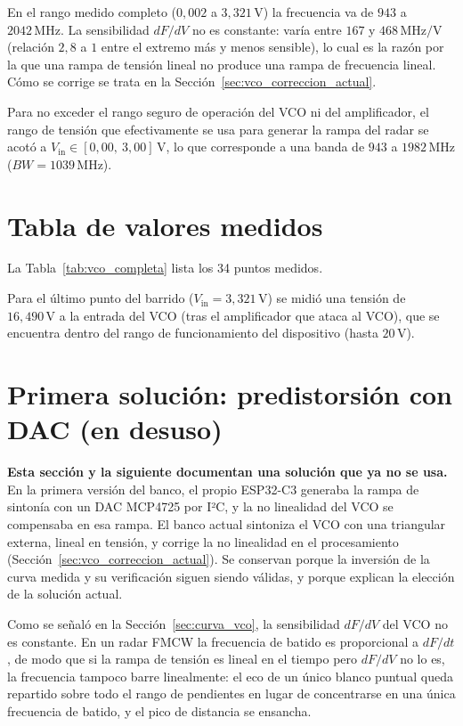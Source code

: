 \documentclass[12pt, a4paper, twoside]{report}
\begin{document}
En el rango medido completo ($0{,}002$ a $3{,}321\,\text{V}$) la
frecuencia va de $943$ a $2042\,\text{MHz}$. La sensibilidad $dF/dV$
no es constante: varía entre $167$ y $468\,\text{MHz/V}$ (relación
$2{,}8$ a $1$ entre el extremo más y menos sensible), lo cual es la
razón por la que una rampa de tensión lineal no produce una rampa de
frecuencia lineal. Cómo se corrige se trata en la
Sección~\ref{sec:vco_correccion_actual}.

Para no exceder el rango seguro de operación del VCO ni del amplificador, el
rango de tensión que efectivamente se usa para generar la rampa del
radar se acotó a $V_\text{in} \in [0{,}00,\ 3{,}00]\,\text{V}$, lo que
corresponde a una banda de $943$ a $1982\,\text{MHz}$
($BW = 1039\,\text{MHz}$).

\section{Tabla de valores medidos}
\label{sec:tabla_vco}

La Tabla~\ref{tab:vco_completa} lista los 34 puntos medidos.



Para el último punto del barrido ($V_\text{in} = 3{,}321\,\text{V}$) se
midió una tensión de $16{,}490\,\text{V}$ a la entrada del VCO (tras el
amplificador que ataca al VCO), que se encuentra dentro del rango
de funcionamiento del dispositivo (hasta $20\,\text{V}$).

\section{Primera solución: predistorsión con DAC (en desuso)}
\label{sec:predistorsion_pchip}

\textbf{Esta sección y la siguiente documentan una solución que ya no se
usa.} En la primera versión del banco, el propio ESP32-C3 generaba la rampa
de sintonía con un DAC MCP4725 por I²C, y la no linealidad del VCO se
compensaba en esa rampa. El banco actual sintoniza el VCO con una triangular
externa, lineal en tensión, y corrige la no linealidad en el procesamiento
(Sección~\ref{sec:vco_correccion_actual}). Se conservan porque la inversión
de la curva medida y su verificación siguen siendo válidas, y porque
explican la elección de la solución actual.

Como se señaló en la Sección~\ref{sec:curva_vco}, la sensibilidad
$dF/dV$ del VCO no es constante. En un radar FMCW la frecuencia de
batido es proporcional a $dF/dt$, de modo que si la rampa de tensión
es lineal en el tiempo pero $dF/dV$ no lo es, la frecuencia tampoco
barre linealmente: el eco de un único blanco puntual queda repartido
sobre todo el rango de pendientes en lugar de concentrarse en una
única frecuencia de batido, y el pico de distancia se ensancha.
\end{document}
